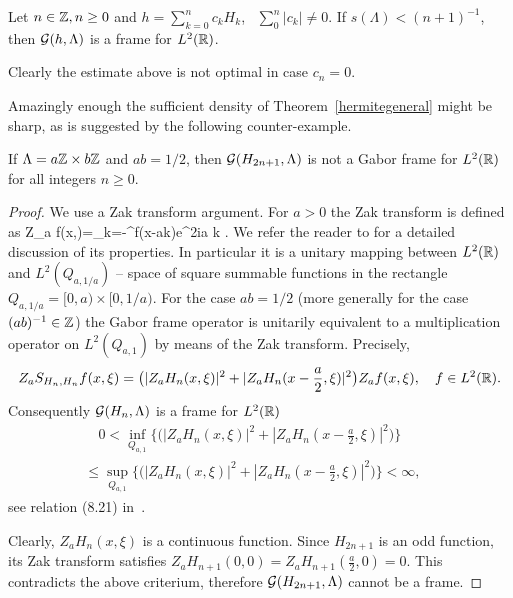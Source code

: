 \documentclass[12pt]{amsart}
\begin{document}
\begin{prop}
  \label{hermitegeneral}
 Let $n\in \mathbb{Z} , n\geq 0$ and $h = \sum _{k=0}^n c_k H_k$, \, $\sum_0^n |c_k|\neq 0$.   If
 $s(\Lambda ) < (n+1)^{-1}$,    then
$\mathcal{G} (h , \Lambda ) $ is a frame for $L^2(\mathbb{R} )$.
\end{prop}
 
  Clearly the estimate above is not optimal in case 
 $c_n=0$.
 \smallskip 


Amazingly enough the sufficient density of Theorem~\ref{hermitegeneral} might be
sharp, as is suggested by the following counter-example. 

 
\begin{prop}
  \label{counter}
If $\Lambda = a \mathbb{Z} \times b \mathbb{Z} $ and $ab = 1/2$, then 
$\mathcal{G} (H_{2n+1}, \Lambda )$ is not a Gabor frame for $L^2(\mathbb{R})$ for all
integers $n\geq 0$. 
\end{prop}
\begin{proof} 
We use a Zak transform argument. For $a>0$ the Zak transform is defined as 
\beq
\label{zak}
Z_a f(x,\xi)=\sum_{k=-\infty}^\infty f(x-ak)e^{2i\pi a k \xi}.
\eeq
We refer the reader to  \cite[Sec.~8.3]{Charlybook} for a detailed
discussion of  its properties.   In particular it is a unitary mapping
between  $L^2(\mathbb{R})$ 
 and $L^2(Q_{a,1/a})$ -- space of square summable functions in the  rectangle
 $Q_{a,1/a}=[0,a)\times[0,1/a)$.
For the case $ab=1/2$ (more generally for the case $(ab)^{-1}\in \mathbb{Z}$)
the Gabor   frame operator is unitarily equivalent to a
multiplication operator  on $
L^2(Q_{a,1})$ by means of  the Zak transform. Precisely, 
\[
Z_a S_{H_n,H_n} f(x,\xi) =
     \big ( |Z_aH_n(x, \xi)|^2 + |Z_a H_n (x-\frac a2, \xi)|^2 \big ) 
               Z_af(x,\xi), \quad f \in   L^2(\mathbb{R}).
\]                  
Consequently  $\mathcal{G} (H_n, \Lambda )$ is a frame for  $L^2(\mathbb{R})$ \fif\
\begin{multline*}
 \quad 0< \inf_{Q_{a,1}} \{ ( |Z_aH_n(x, \xi)|^2 + |Z_a H_n (x-\frac
 a2, \xi)|^2 \big )  \}   \\ 
\leq \sup_{Q_{a,1}} \{ ( |Z_aH_n(x, \xi)|^2 + |Z_a H_n (x-\frac a2, \xi)|^2 \big )  \} <\infty,
         \quad 
 \end{multline*}
 see relation (8.21) in~\cite{Charlybook}. 

Clearly,   $Z_aH_n(x,\xi)$ is 
 a continuous function.  Since $H_{2n+1}$ is an odd function, its Zak
 transform   satisfies $Z_aH_{n+1}(0,0)=Z_aH_{n+1}(\frac a2, 0)=0$. This
 contradicts  the above criterium, therefore $\mathcal{G} (H_{2n+1}, \Lambda
 )$ cannot be a frame.  
 \end{proof}
\end{document}

